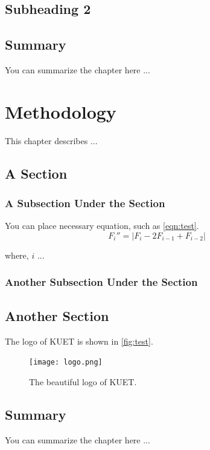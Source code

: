 \documentclass[a4paper,12pt,oneside]{book}
\begin{document}
\section{Subheading 2}

\section{Summary}
You can summarize the chapter here ...

\chapter{Methodology}\label{chap:method}
This chapter describes ...

\section{A Section}\label{sec:sec_1}

\subsection{A Subsection Under the Section}
You can place necessary equation, such as \autoref{eqn:test}.
\begin{equation}
	F_i''=\lvert F_i-2F_{i-1}+F_{i-2} \rvert 
	\label{eqn:test}
\end{equation}

where, $i$ ...

\subsection{Another Subsection Under the Section}

\section{Another Section}
The logo of KUET is shown in \autoref{fig:test}.
\begin{figure}[!hbtp]
\centering
\texttt{[image: logo.png]}
\caption{The beautiful logo of KUET.}
\label{fig:test}
\end{figure}

\section{Summary}
You can summarize the chapter here ...

\end{document}
